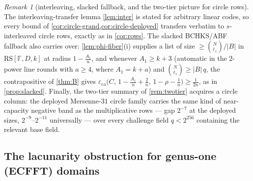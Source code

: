 \documentclass[11pt]{article}
\theoremstyle{definition}
\theoremstyle{remark}
\newtheorem{remark}[theorem]{Remark}
\newcommand{\F}{\mathbb{F}}
\newcommand{\B}{B}
\newcommand{\RS}{\mathrm{RS}}
\newcommand{\eca}{\varepsilon_{\mathrm{ca}}}
\begin{document}
\begin{remark}[interleaving, slacked fallback, and the two-tier picture for circle rows]\label{rem:circle-transfer}
The interleaving-transfer lemma \cref{lem:inter} is stated for arbitrary linear codes, so every bound of \cref{cor:circle-grand,cor:circle-deployed} transfers verbatim to $s$-interleaved circle rows, exactly as in \cref{cor:rows}. The slacked BCHKS/ABF fallback also carries over: \cref{lem:phi-fiber}(i) supplies a list of size $\ge\binom N{\ell_1}/|\B|$ in $\RS[\F,D,k]$ at radius $1-\frac{A_1}n$, and whenever $A_1\ge k+3$ \textup(automatic in the $2$-power line rounds with $a\ge4$, where $A_1=k+a$\textup) and $\binom N{\ell_1}\ge|\B|\,q$, the contrapositive of \cref{thm:B} gives $\eca\bigl(C,\,1-\frac{A_1}n+\frac2n,\,1-\rho-\frac1n\bigr)\ge\frac1{2n}$, as in \cref{prop:slacked}. Finally, the two-tier summary of \cref{rem:twotier} acquires a circle column: the deployed Mersenne-$31$ circle family carries the same kind of near-capacity negative band as the multiplicative rows --- gap $2^{-7}$ at the deployed sizes, $2^{-9}$--$2^{-11}$ universally --- over every challenge field $q<2^{256}$ containing the relevant base field.
\end{remark}

\subsection{The lacunarity obstruction for genus-one (ECFFT) domains}
\label{sec:ecfft}
\end{document}

